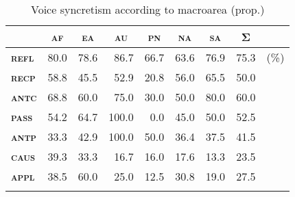 \begin{table}
	\setlength{\tabcolsep}{3pt}
	\begin{tabularx}{.63\textwidth}{lrrrrrrrl}
		\lsptoprule
		& \multicolumn{1}{c}{\textbf{\textsc{af}}} & \multicolumn{1}{c}{\textbf{\textsc{ea}}} & \multicolumn{1}{c}{\textbf{\textsc{au}}} & \multicolumn{1}{c}{\textbf{\textsc{pn}}} & \multicolumn{1}{c}{\textbf{\textsc{na}}} & \multicolumn{1}{c}{\textbf{\textsc{sa}}} & \multicolumn{1}{c}{\textbf{Σ}} & \\
		\midrule
		\textbf{\textsc{refl}} & 80.0 & 78.6 & 86.7 & 66.7 & 63.6 & 76.9 & 75.3 & (\%) \\
		\textbf{\textsc{recp}} & 58.8 & 45.5 & 52.9 & 20.8 & 56.0 & 65.5 & 50.0 & \\
		\textbf{\textsc{antc}} & 68.8 & 60.0 & 75.0 & 30.0 & 50.0 & 80.0 & 60.0 & \\
		\textbf{\textsc{pass}} & 54.2 & 64.7 & 100.0 & 0.0 & 45.0 & 50.0 & 52.5 & \\
		\textbf{\textsc{antp}} & 33.3 & 42.9 & 100.0 & 50.0 & 36.4 & 37.5 & 41.5 & \\
		\textbf{\textsc{caus}} & 39.3 & 33.3 & 16.7 & 16.0 & 17.6 & 13.3 & 23.5 & \\
		\textbf{\textsc{appl}} & 38.5 & 60.0 & 25.0 & 12.5 & 30.8 & 19.0 & 27.5 & \\
		\lspbottomrule
	\end{tabularx}
	\caption{Voice syncretism according to macroarea (prop.)}
	\label{tab:ch6:voice-syncretism-macroarea-2}
\end{table}

